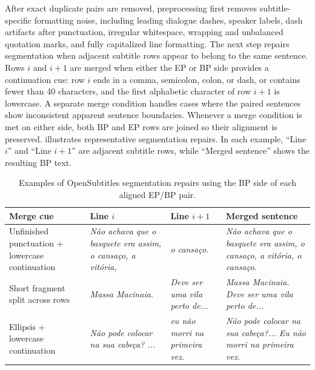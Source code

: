 {
After exact duplicate pairs are removed, preprocessing first removes
subtitle-specific formatting noise, including leading dialogue dashes, speaker
labels, dash artifacts after punctuation, irregular whitespace, wrapping and
unbalanced quotation marks, and fully capitalized line formatting. The next step
repairs segmentation when adjacent subtitle rows appear to belong to the same
sentence. Rows \(i\) and \(i+1\) are merged when either the EP or BP side
provides a continuation cue: row \(i\) ends in a comma, semicolon, colon, or dash,
or contains fewer than 40 characters, and the first alphabetic character of row
\(i+1\) is lowercase. A separate merge condition handles cases where the paired
sentences show inconsistent apparent sentence boundaries. Whenever a merge
condition is met on either side, both BP and EP rows are joined so their
alignment is preserved.  illustrates
representative segmentation repairs. In each example, ``Line \(i\)'' and ``Line
\(i+1\)'' are adjacent subtitle rows, while ``Merged sentence'' shows the resulting BP text.\par}

\begin{table}[htbp]
  \centering
  \thesistablefont
  \caption{Examples of OpenSubtitles segmentation repairs using the BP side of each aligned EP/BP pair.}
  \label{tab:opensubs-merge-examples}
  \begin{tabularx}{\textwidth}{@{}YYYY@{}}
    \toprule
    Merge cue & Line \(i\) & Line \(i+1\) & Merged sentence \\
    \midrule
    Unfinished punctuation + lowercase continuation &
    \textit{N\~ao achava que o basquete era assim, o cansa\c{c}o, a vit\'oria,} &
    \textit{o cansa\c{c}o.} &
    \textit{N\~ao achava que o basquete era assim, o cansa\c{c}o, a vit\'oria, o cansa\c{c}o.} \\
    \addlinespace
    Short fragment split across rows &
    \textit{Massa Macinaia.} &
    \textit{Deve ser uma vila perto de...} &
    \textit{Massa Macinaia. Deve ser uma vila perto de...} \\
    \addlinespace
    Ellipsis + lowercase continuation &
    \textit{N\~ao pode colocar na sua cabe\c{c}a? ...} &
    \textit{eu n\~ao morri na primeira vez.} &
    \textit{N\~ao pode colocar na sua cabe\c{c}a?... Eu n\~ao morri na primeira vez.} \\
    \bottomrule
  \end{tabularx}
\end{table}

